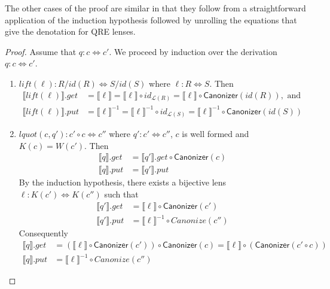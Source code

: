 \documentclass{svproc}
\newcommand{\kw}[1]{\ensuremath{\mathsf{#1}}}
\newcommand{\canonizer}{\ensuremath{\kw{Canonizer}}}
\begin{document}
The other cases of the proof are similar in that they follow from a
straightforward application of the induction hypothesis followed by unrolling
the equations that give the denotation for QRE lenses.
\iffalse
\begin{proof}
Assume that $q : c \Leftrightarrow c'$. We proceed by induction over the
derivation $q : c \Leftrightarrow c'$.
\begin{enumerate}
  \item
  $\mathit{lift}(\ell): R/\mathit{id}(R) \Leftrightarrow S/\mathit{id}(S)$ where
  $\ell :
  R \Leftrightarrow S$. Then
  \begin{align*}
  \llbracket \mathit{lift}(\ell) \rrbracket.get &=  \llbracket \ell \rrbracket
  = \llbracket \ell \rrbracket \circ id_{\mathcal{L}(R)} =
  \llbracket \ell \rrbracket \circ \canonizer(\mathit{id}(R)), \text{ and }\\
  \llbracket \mathit{lift}(\ell) \rrbracket.put &= \llbracket \ell
  \rrbracket^{-1} = \llbracket \ell \rrbracket^{-1} \circ id_{\mathcal{L}(S)} =
  \llbracket \ell \rrbracket^{-1} \circ \canonizer(id(S))
  \end{align*}
  \item
  $\mathit{lquot}(c, q'): c' \circ c \Leftrightarrow c''$ where $q' : c' 
  \Leftrightarrow c''$, $c$ is well formed and $K(c) = W(c')$. Then
\begin{align*}
  \llbracket q \rrbracket.get  &= \llbracket q'
  \rrbracket.get \circ \canonizer(c)\\
  \llbracket q \rrbracket.put &= \llbracket q' \rrbracket.put
  \end{align*}
  By the induction hypothesis, there exists a bijective lens $\ell :
  K(c') \Leftrightarrow K(c'')$ such that 
  \begin{align*}
\llbracket q' \rrbracket.get &= \llbracket \ell \rrbracket \circ \canonizer(c')\\
\llbracket q' \rrbracket.put &= \llbracket \ell \rrbracket^{-1} \circ
Canonize(c'')
\end{align*}
Consequently
\begin{align*}
  \llbracket q \rrbracket.get  &= (\llbracket \ell \rrbracket \circ
  \canonizer(c')) \circ \canonizer(c) = \llbracket \ell \rrbracket \circ
  (\canonizer(c' \circ c))\\
  \llbracket q \rrbracket.put &= \llbracket \ell \rrbracket^{-1} \circ
  Canonize(c'')
  \end{align*}


\end{enumerate}
\end{proof}
\end{document}
